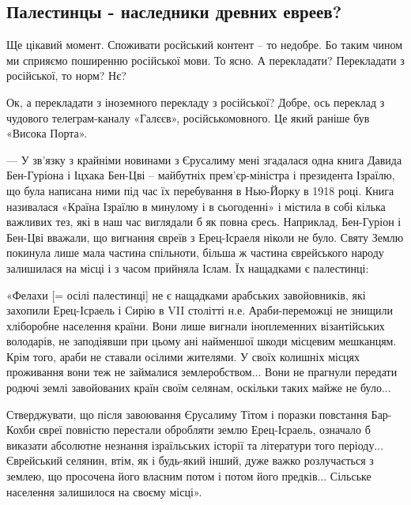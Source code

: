  
 
 
 
 
\subsection{Палестинцы - наследники древних евреев?}

Ще цікавий момент. Споживати росйський контент – то недобре. Бо таким чином ми
сприяємо поширенню російської мови. То ясно.  А перекладати? Перекладати з
російської, то норм? Нє?

Ок, а перекладати з іноземного перекладу з російської?  Добре, ось переклад з
чудового телеграм-каналу «Галєєв», російськомовного. Це який раніше був «Висока
Порта».

—
У зв'язку з крайніми новинами з Єрусалиму мені згадалася одна книга Давида
Бен-Гуріона і Іцхака Бен-Цві – майбутніх прем'єр-міністра і президента Ізраїлю,
що була написана ними під час їх перебування в Нью-Йорку в 1918 році. Книга
називалася «Країна Ізраїлю в минулому і в сьогоденні» і містила в собі кілька
важливих тез, які в наш час виглядали б як повна єресь. Наприклад, Бен-Гуріон і
Бен-Цві вважали, що вигнання євреїв з Ерец-Ісраеля ніколи не було. Святу Землю
покинула лише мала частина спільноти, більша ж частина єврейського народу
залишилася на місці і з часом прийняла Іслам. Їх нащадками є палестинці:

«Фелахи [= осілі палестинці] не є нащадками арабських завойовників, які
захопили Ерец-Ісраель і Сирію в VII столітті н.е. Араби-переможці не знищили
хліборобне населення країни. Вони лише вигнали іноплеменних візантійських
володарів, не заподіявши при цьому ані найменшої шкоди місцевим мешканцям. Крім
того, араби не ставали осілими жителями. У своїх колишніх місцях проживання
вони теж не займалися землеробством... Вони не прагнули передати родючі землі
завойованих країн своїм селянам, оскільки таких майже не було...

Стверджувати, що після завоювання Єрусалиму Тітом і поразки повстання Бар-Кохби
євреї повністю перестали обробляти землю Ерец-Ісраель, означало б виказати
абсолютне незнання ізраїльських історії та літератури того періоду...
Єврейський селянин, втім, як і будь-який інший, дуже важко розлучається з
землею, що просочена його власним потом і потом його предків... Сільське
населення залишилося на своєму місці».

